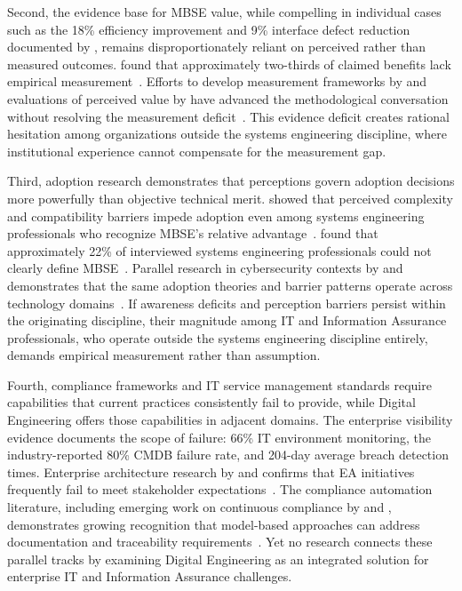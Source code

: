 Second, the evidence base for MBSE value, while compelling in individual cases such as the 18\% efficiency improvement and 9\% interface defect reduction documented by \textcite{Rogers_Mitchell_2021}, remains disproportionately reliant on perceived rather than measured outcomes. \citeauthor{Henderson_Salado_2021} found that approximately two-thirds of claimed benefits lack empirical measurement~\parencite{Henderson_Salado_2021}. Efforts to develop measurement frameworks by \citeauthor{Henderson_2023_Metrics} and evaluations of perceived value by \citeauthor{Campo_2023} have advanced the methodological conversation without resolving the measurement deficit~\parencite{Henderson_2023_Metrics, Campo_2023}. This evidence deficit creates rational hesitation among organizations outside the systems engineering discipline, where institutional experience cannot compensate for the measurement gap.

Third, adoption research demonstrates that perceptions govern adoption decisions more powerfully than objective technical merit. \citeauthor{Call_2024} showed that perceived complexity and compatibility barriers impede adoption even among systems engineering professionals who recognize MBSE's relative advantage~\parencite{Call_2024}. \citeauthor{Henderson_McDermott_Salado_2024} found that approximately 22\% of interviewed systems engineering professionals could not clearly define MBSE~\parencite{Henderson_McDermott_Salado_2024}. Parallel research in cybersecurity contexts by \citeauthor{Hasani_2023} and \citeauthor{Anthony_2024} demonstrates that the same adoption theories and barrier patterns operate across technology domains~\parencite{Hasani_2023, Anthony_2024}. If awareness deficits and perception barriers persist within the originating discipline, their magnitude among IT and Information Assurance professionals, who operate outside the systems engineering discipline entirely, demands empirical measurement rather than assumption.

Fourth, compliance frameworks and IT service management standards require capabilities that current practices consistently fail to provide, while Digital Engineering offers those capabilities in adjacent domains. The enterprise visibility evidence documents the scope of failure: 66\% IT environment monitoring, the industry-reported 80\% CMDB failure rate, and 204-day average breach detection times. Enterprise architecture research by \citeauthor{Tamm_2022} and \citeauthor{van_de_Wetering_2022} confirms that EA initiatives frequently fail to meet stakeholder expectations~\parencite{Tamm_2022, van_de_Wetering_2022}. The compliance automation literature, including emerging work on continuous compliance by \citeauthor{Santilli_2023} and \citeauthor{Angermeir_2024}, demonstrates growing recognition that model-based approaches can address documentation and traceability requirements~\parencite{Santilli_2023, Angermeir_2024}. Yet no research connects these parallel tracks by examining Digital Engineering as an integrated solution for enterprise IT and Information Assurance challenges.

